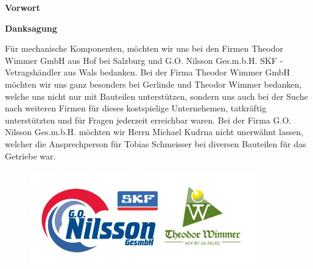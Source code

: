 \begin{center}
\begin{huge}
\textbf{Vorwort}
\end{huge}
\end{center}

\bigskip
{}


\newpage
\thispagestyle{empty}
\mbox{}
\newpage

\begin{center}
\begin{huge}
\textbf{Danksagung}
\end{huge}
\end{center}

Für mechanische Komponenten, möchten wir uns bei den Firmen Theodor Wimmer GmbH aus Hof bei Salzburg und G.O. Nilsson Ges.m.b.H. SKF - Vetragshändler aus Wals bedanken. Bei der Firma Theodor Wimmer GmbH möchten wir uns ganz besonders bei Gerlinde und Theodor Wimmer bedanken, welche uns nicht nur mit Bauteilen unterstützen, sondern uns auch bei der Suche nach weiteren Firmen für dieses kostspielige Unternehemen, tatkräftig unterstützten und für Fragen jederzeit erreichbar waren. Bei der Firma G.O. Nilsson Ges.m.b.H. möchten wir Herrn Michael Kudrna nicht unerwähnt lassen, welcher die Ansprechperson für Tobias Schmeisser bei diversen Bauteilen für das Getriebe war.

\begin{figure} [H]
	\begin{center}
		\includegraphics[width=10cm]{figures/mechanik/Sponsoren.jpg}		
	\end{center}
\end{figure}
	
